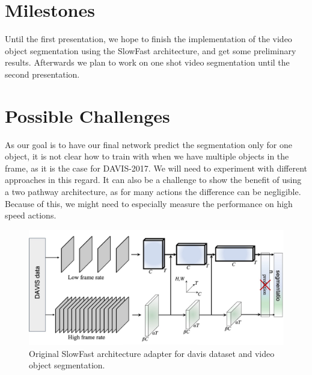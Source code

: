 \documentclass[conference]{IEEEtran}
\begin{document}
\section{Milestones}
Until the first presentation, we hope to finish the implementation of the video object segmentation using the SlowFast architecture, and get some preliminary results. Afterwards we plan to work on one shot video segmentation until the second presentation.
\section{Possible Challenges}
As our goal is to have our final network predict the segmentation only for one object, it is not clear how to train with when we have multiple objects in the frame, as it is the case for DAVIS-2017. We will need to experiment with different approaches in this regard. It can also be a challenge to show the benefit of using a two pathway architecture, as for many actions the difference can be negligible. Because of this, we might need to especially measure the performance on high speed actions.


\begin{figure}
	\centering
	\includegraphics[width=1.8\columnwidth]{SlowFastAdapted.jpg}
	\caption{Original SlowFast architecture adapter for davis dataset and video object segmentation.}
	\label{fig:slowfastadapted}
\end{figure}
\newpage



\end{document}
